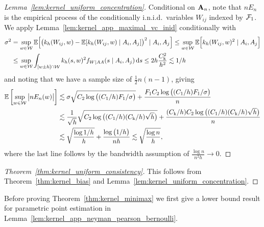 \begin{proof}[Lemma~\ref{lem:kernel_uniform_concentration}]

  Conditional on $\mathbf{A}_n$,
  note that $n E_n$
  is the empirical process of the conditionally
  i.n.i.d.\ variables $W_{i j}$
  indexed by $\mathcal{F}_1$.
  We apply Lemma~\ref{lem:kernel_app_maximal_vc_inid}
  conditionally with
  \begin{align*}
    \sigma^2
    &=
    \sup_{w \in \mathcal{W}}
    \mathbb{E}\Big[
      \big(
        k_h(W_{i j},w)
        - \mathbb{E}[k_h(W_{i j},w) \mid A_i, A_j]
      \big)^2
      \mid A_i, A_j
    \Big]
    \leq
    \sup_{w \in \mathcal{W}}
    \mathbb{E}\Big[
      k_h(W_{i j},w)^2
      \mid A_i, A_j
    \Big] \\
    &\leq
    \sup_{w \in \mathcal{W}}
    \int_{[w \pm h] \cap \mathcal{W}}
    k_h(s,w)^2
    f_{W \mid AA}(s \mid A_i, A_j)
    \,\mathrm{d}s
    \leq 2h \frac{C_{\mathrm{k}}^2}{h^2}
    \lesssim 1/h
  \end{align*}
  and noting that we have
  a sample size of
  $\frac{1}{2}n(n-1)$,
  giving
  \begin{align*}
    \mathbb{E} \left[
      \sup_{w \in \mathcal{W}}
      \big| n E_n(w) \big|
    \right]
    &\lesssim
    \sigma
    \sqrt{C_2 \log \big((C_1/h) F_1 / \sigma \big)}
    +
    \frac{F_1 C_2 \log \big((C_1/h) F_1 / \sigma\big)}
    {n} \\
    &\lesssim
    \frac{1}{\sqrt h}
    \sqrt{C_2 \log \big((C_1/h) (C_{\mathrm{k}}/h) \sqrt h \big)}
    +
    \frac{(C_{\mathrm{k}}/h) C_2 \log \big((C_1/h) (C_{\mathrm{k}}/h) \sqrt h \big)}
    {n} \\
    &\lesssim
    \sqrt{\frac{\log 1/h}{h}}
    +
    \frac{\log \big(1/h\big)}
    {n h}
    \lesssim
    \sqrt{\frac{\log n}{h}},
  \end{align*}
  where the last line follows by the bandwidth assumption
  of $\frac{\log n}{n^2h} \to 0$.
\end{proof}

\begin{proof}[Theorem~\ref{thm:kernel_uniform_consistency}]
  This follows from Theorem~\ref{thm:kernel_bias}
  and Lemma~\ref{lem:kernel_uniform_concentration}.
\end{proof}

Before proving Theorem~\ref{thm:kernel_minimax}
we first give a lower bound result
for parametric point estimation in
Lemma~\ref{lem:kernel_app_neyman_pearson_bernoulli}.

